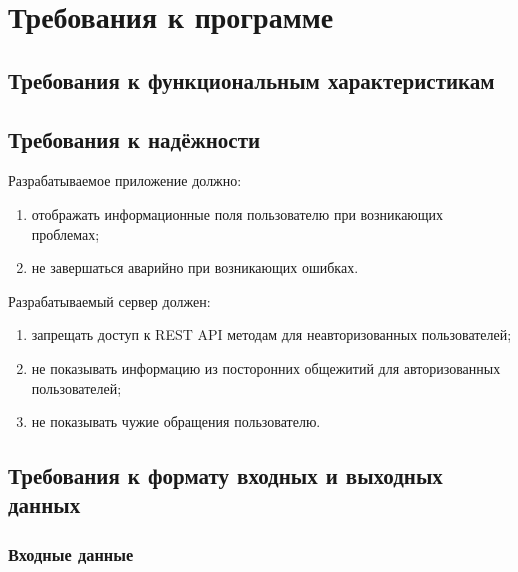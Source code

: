 \section{Требования к программе}

\subsection{Требования к функциональным характеристикам}



\subsection{Требования к надёжности}

Разрабатываемое приложение должно:

\begin{enumerate}
    \item отображать информационные поля пользователю при возникающих проблемах;
    \item не завершаться аварийно при возникающих ошибках.
\end{enumerate}

Разрабатываемый сервер должен:

\begin{enumerate}
    \item запрещать доступ к REST API методам для неавторизованных пользователей;
    \item не показывать информацию из посторонних общежитий для авторизованных пользователей;
    \item не показывать чужие обращения пользователю.
\end{enumerate}


%

\subsection{Требования к формату входных и выходных данных}

\subsubsection{Входные данные}

